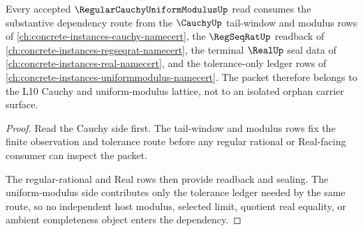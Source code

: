 \begin{theorem}
\label{thm:regular-cauchy-uniform-modulus-cauchy-uniformmodulus-dependency-route}
Every accepted $\RegularCauchyUniformModulusUp$ read consumes the substantive dependency route from the $\CauchyUp$ tail-window and modulus rows of \autoref{ch:concrete-instances-cauchy-namecert}, the $\RegSeqRatUp$ readback of \autoref{ch:concrete-instances-regseqrat-namecert}, the terminal $\RealUp$ seal data of \autoref{ch:concrete-instances-real-namecert}, and the tolerance-only ledger rows of \autoref{ch:concrete-instances-uniformmodulus-namecert}. The packet therefore belongs to the L10 Cauchy and uniform-modulus lattice, not to an isolated orphan carrier surface.
\end{theorem}
\begin{proof}
Read the Cauchy side first. The tail-window and modulus rows fix the finite observation and tolerance route before any regular rational or Real-facing consumer can inspect the packet.

The regular-rational and Real rows then provide readback and sealing. The uniform-modulus side contributes only the tolerance ledger needed by the same route, so no independent host modulus, selected limit, quotient real equality, or ambient completeness object enters the dependency.
\end{proof}
